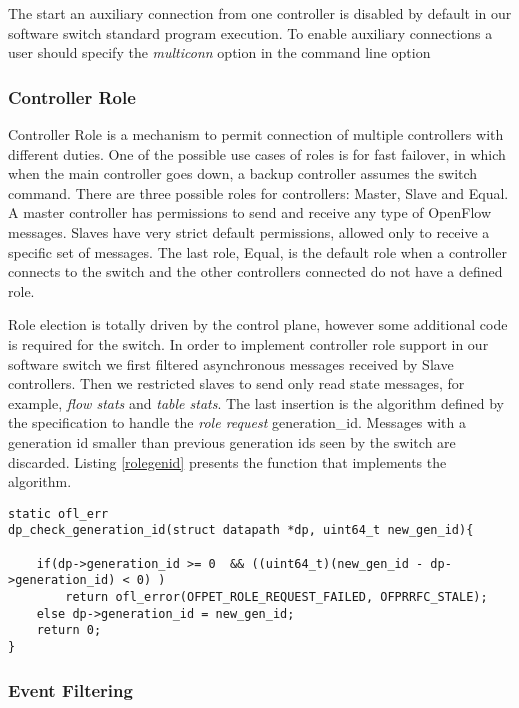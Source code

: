     The start an auxiliary connection from one controller is disabled by default in our software switch standard program execution. To enable auxiliary connections a user should specify the \textit{multiconn} option in the command line option   

    \subsubsection{Controller Role}

    Controller Role is a mechanism to permit connection of multiple controllers with different duties. One of the possible use cases of roles is for fast failover, in which when the main controller goes down, a backup controller assumes the switch command. There are three possible roles for controllers: Master, Slave and Equal. A master controller has permissions to send and receive any type of OpenFlow messages. Slaves have very strict default permissions, allowed only to receive a specific set of messages. The last role, Equal, is the default role when a controller connects to the switch and the other controllers connected do not have a defined role.
    
    Role election is totally driven by the control plane, however some additional code is required for the switch. In order to implement controller role support in our software switch we first filtered asynchronous messages received by Slave controllers. Then we restricted slaves to send only read state messages, for example, \textit{flow stats} and \textit{table stats}. The last insertion is the algorithm defined by the specification to handle the \textit{role request} generation_id. Messages with a generation id smaller than previous generation ids seen by the switch are discarded. Listing \ref{rolegenid} presents the function that implements the algorithm.
\pagebreak
\begin{lstlisting}[caption={Ethernet parsing in the nbee_link module}, label=rolegenid,]
static ofl_err
dp_check_generation_id(struct datapath *dp, uint64_t new_gen_id){

    if(dp->generation_id >= 0  && ((uint64_t)(new_gen_id - dp->generation_id) < 0) )
        return ofl_error(OFPET_ROLE_REQUEST_FAILED, OFPRRFC_STALE);
    else dp->generation_id = new_gen_id;
    return 0;
}
\end{lstlisting} 
    \subsubsection{Event Filtering}

